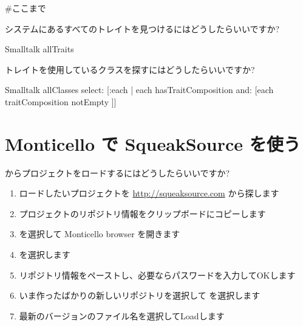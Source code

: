 \documentclass[a4paper,10pt,twoside]{book}
\begin{document}
#ここまで

\begin{faq}
システムにあるすべてのトレイトを見つけるにはどうしたらいいですか?
\end{faq}
\answer
\begin{code}{}
Smalltalk allTraits
\end{code}

\begin{faq}
トレイトを使用しているクラスを探すにはどうしたらいいですか?
\end{faq}
\answer
\begin{code}{}
Smalltalk allClasses select: [:each | each hasTraitComposition and: [each traitComposition notEmpty ]]
\end{code}

\section{Monticello で SqueakSource を使う}

\begin{faq}
 からプロジェクトをロードするにはどうしたらいいですか?
\end{faq}
\answer
\begin{enumerate}
  \item ロードしたいプロジェクトを \url{http://squeaksource.com} から探します
  \item プロジェクトのリポジトリ情報をクリップボードにコピーします
  \item {} を選択して Monticello browser を開きます
  \item {} を選択します
  \item リポジトリ情報をペーストし、必要ならパスワードを入力してOKします
  \item いま作ったばかりの新しいリポジトリを選択して  を選択します
  \item 最新のバージョンのファイル名を選択してLoadします
\end{enumerate}
\end{document}
